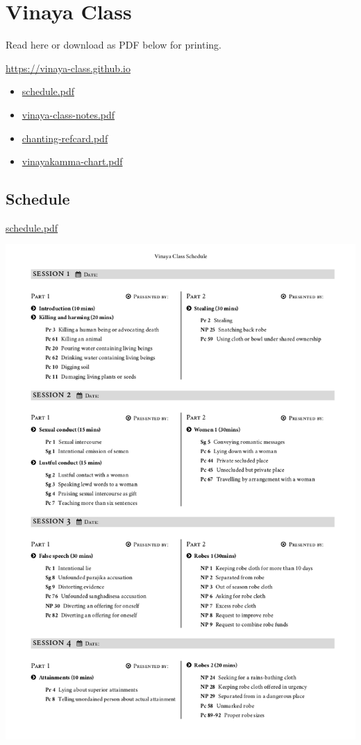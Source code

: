 \chapter{Vinaya Class}

Read here or download as PDF below for printing.

\url{https://vinaya-class.github.io}

\begin{itemize}
\tightlist
\item
  \href{./includes/docs/schedule.pdf}{schedule.pdf}
\item
  \href{./includes/docs/vinaya-class-notes.pdf}{vinaya-class-notes.pdf}
\item
  \href{./includes/docs/chanting-refcard.pdf}{chanting-refcard.pdf}
\item
  \href{./includes/docs/vinayakamma-chart.pdf}{vinayakamma-chart.pdf}
\end{itemize}

\section{Schedule}

\href{./includes/docs/schedule.pdf}{schedule.pdf}

\href{./includes/docs/schedule.pdf}{\includegraphics{./includes/docs/schedule-thumb.png}}

